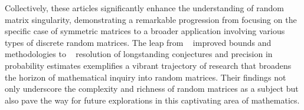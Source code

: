 Collectively, these articles significantly enhance the understanding of random matrix singularity, demonstrating a remarkable progression from focusing on the specific case of symmetric matrices to a broader application involving various types of discrete random matrices.
The leap from ~\cite{campos2020singularity} improved bounds and methodologies to ~\cite{jain2021singularity} resolution of longstanding conjectures and precision in probability estimates exemplifies a vibrant trajectory of research that broadens the horizon of mathematical inquiry into random matrices. 
Their findings not only underscore the complexity and richness of random matrices as a subject but also pave the way for future explorations in this captivating area of mathematics.